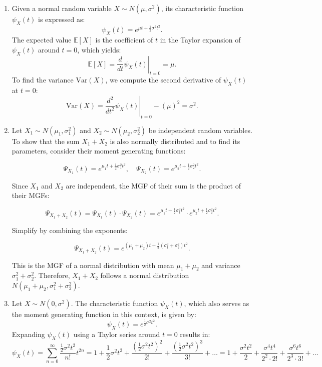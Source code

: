 \begin{enumerate}[label=(\alph*)]
    \item Given a normal random variable \( X \sim N(\mu, \sigma^2) \), its characteristic function \( \psi_X(t) \) is expressed as:
    \[
    \psi_X(t) = e^{\mu t + \frac{1}{2} \sigma^2 t^2}.
    \]
    The expected value \( \mathbb{E}[X] \) is the coefficient of \( t \) in the Taylor expansion of \( \psi_X(t) \) around \( t=0 \), which yields:
    \[
    \mathbb{E}[X] = \left. \frac{d}{dt}\psi_X(t) \right|_{t=0} = \mu.
    \]
    To find the variance \( \text{Var}(X) \), we compute the second derivative of \( \psi_X(t) \) at \( t=0 \):
    \[
    \text{Var}(X) = \left. \frac{d^2}{dt^2}\psi_X(t) \right|_{t=0} - (\mu)^2 = \sigma^2.
    \]

    \item Let \( X_1 \sim N(\mu_1, \sigma_1^2) \) and \( X_2 \sim N(\mu_2, \sigma_2^2) \) be independent random variables. To show that the sum \( X_1 + X_2 \) is also normally distributed and to find its parameters, consider their moment generating functions:

    \[
    \Psi_{X_1}(t) = e^{\mu_1 t + \frac{1}{2} \sigma_1^2 t^2}, \quad \Psi_{X_2}(t) = e^{\mu_2 t + \frac{1}{2} \sigma_2^2 t^2}.
    \]
    
    Since \( X_1 \) and \( X_2 \) are independent, the MGF of their sum is the product of their MGFs:
    
    \[
    \Psi_{X_1 + X_2}(t) = \Psi_{X_1}(t) \cdot \Psi_{X_2}(t) = e^{\mu_1 t + \frac{1}{2} \sigma_1^2 t^2} \cdot e^{\mu_2 t + \frac{1}{2} \sigma_2^2 t^2}.
    \]
    
    Simplify by combining the exponents:
    
    \[
    \Psi_{X_1 + X_2}(t) = e^{(\mu_1 + \mu_2) t + \frac{1}{2} (\sigma_1^2 + \sigma_2^2) t^2}.
    \]
    
    This is the MGF of a normal distribution with mean \( \mu_1 + \mu_2 \) and variance \( \sigma_1^2 + \sigma_2^2 \). Therefore, \( X_1 + X_2 \) follows a normal distribution \( N(\mu_1 + \mu_2, \sigma_1^2 + \sigma_2^2) \).
    \item 

    Let \( X \sim N(0, \sigma^2) \). The characteristic function \( \psi_X(t) \), which also serves as the moment generating function in this context, is given by:
    \[
    \psi_X(t) = e^{\frac{1}{2} \sigma^2 t^2}.
    \]
    Expanding \( \psi_X(t) \) using a Taylor series around \( t = 0 \) results in:
    \[
    \psi_X(t) = \sum_{n=0}^{\infty} \frac{\frac{1}{2}\sigma^2 t^2}{n!} t^{2n} = 1 + \frac{1}{2}\sigma^2 t^2 + \frac{(\frac{1}{2}\sigma^2 t^2)^2}{2!} + \frac{(\frac{1}{2}\sigma^2 t^2)^3}{3!} + \ldots
= 1 + \frac{\sigma^2 t^2}{2 } + \frac{\sigma^4 t^4}{2^2 \cdot 2!} + \frac{\sigma^6 t^6}{2^3 \cdot 3!} + \ldots
    \]
    

\end{enumerate}
